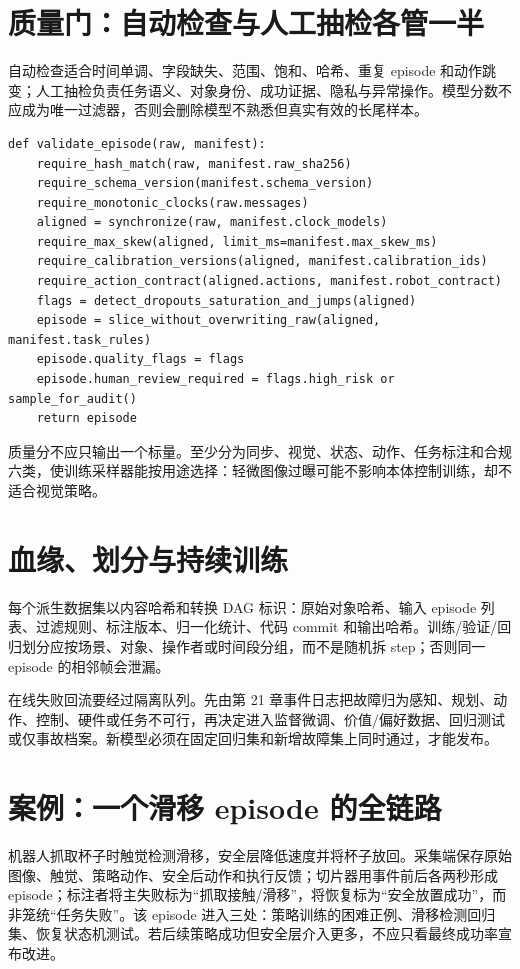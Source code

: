 \section{质量门：自动检查与人工抽检各管一半}

自动检查适合时间单调、字段缺失、范围、饱和、哈希、重复 episode 和动作跳变；人工抽检负责任务语义、对象身份、成功证据、隐私与异常操作。模型分数不应成为唯一过滤器，否则会删除模型不熟悉但真实有效的长尾样本。

\begin{lstlisting}[caption={episode 入库质量门的教学伪代码}]
def validate_episode(raw, manifest):
    require_hash_match(raw, manifest.raw_sha256)
    require_schema_version(manifest.schema_version)
    require_monotonic_clocks(raw.messages)
    aligned = synchronize(raw, manifest.clock_models)
    require_max_skew(aligned, limit_ms=manifest.max_skew_ms)
    require_calibration_versions(aligned, manifest.calibration_ids)
    require_action_contract(aligned.actions, manifest.robot_contract)
    flags = detect_dropouts_saturation_and_jumps(aligned)
    episode = slice_without_overwriting_raw(aligned, manifest.task_rules)
    episode.quality_flags = flags
    episode.human_review_required = flags.high_risk or sample_for_audit()
    return episode
\end{lstlisting}

质量分不应只输出一个标量。至少分为同步、视觉、状态、动作、任务标注和合规六类，使训练采样器能按用途选择：轻微图像过曝可能不影响本体控制训练，却不适合视觉策略。

\section{血缘、划分与持续训练}

每个派生数据集以内容哈希和转换 DAG 标识：原始对象哈希、输入 episode 列表、过滤规则、标注版本、归一化统计、代码 commit 和输出哈希。训练/验证/回归划分应按场景、对象、操作者或时间段分组，而不是随机拆 step；否则同一 episode 的相邻帧会泄漏。

在线失败回流要经过隔离队列。先由第 21 章事件日志把故障归为感知、规划、动作、控制、硬件或任务不可行，再决定进入监督微调、价值/偏好数据、回归测试或仅事故档案。新模型必须在固定回归集和新增故障集上同时通过，才能发布。

\section{案例：一个滑移 episode 的全链路}

机器人抓取杯子时触觉检测滑移，安全层降低速度并将杯子放回。采集端保存原始图像、触觉、策略动作、安全后动作和执行反馈；切片器用事件前后各两秒形成 episode；标注者将主失败标为“抓取接触/滑移”，将恢复标为“安全放置成功”，而非笼统“任务失败”。该 episode 进入三处：策略训练的困难正例、滑移检测回归集、恢复状态机测试。若后续策略成功但安全层介入更多，不应只看最终成功率宣布改进。


